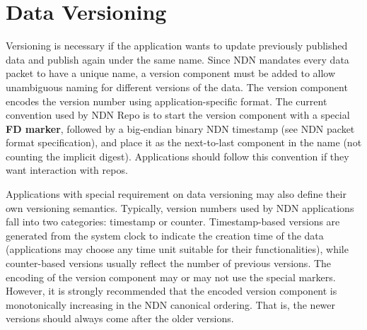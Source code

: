 \section{Data Versioning}

Versioning is necessary if the application wants to update previously published data and publish again under the same name. Since NDN mandates every data packet to have a unique name, a version component must be added to allow unambiguous naming for different versions of the data. The version component encodes the version number using application-specific format. The current convention used by NDN Repo is to start the version component with a special \textbf{FD marker}, followed by a big-endian binary NDN timestamp (see NDN packet format specification), and place it as the next-to-last component in the name (not counting the implicit digest). Applications should follow this convention if they want interaction with repos.

Applications with special requirement on data versioning may also define their own versioning semantics. Typically, version numbers used by NDN applications fall into two categories: timestamp or counter. Timestamp-based versions are generated from the system clock to indicate the creation time of the data (applications may choose any time unit suitable for their functionalities), while counter-based versions usually reflect the number of previous versions. The encoding of the version component may or may not use the special markers. However, it is strongly recommended that the encoded version component is monotonically increasing in the NDN canonical ordering. That is, the newer versions should always come after the older versions.


